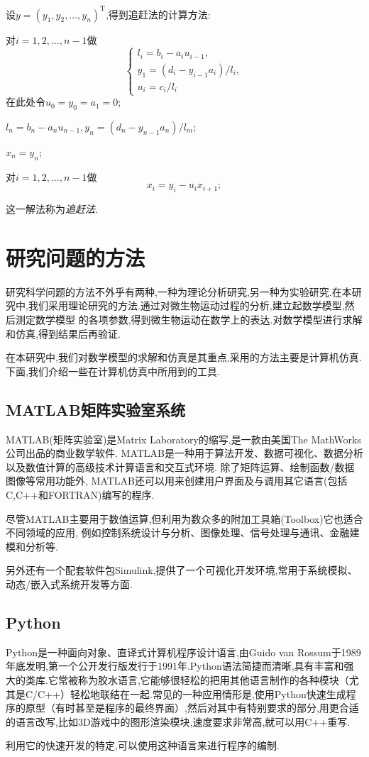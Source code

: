 设$y=(y_1,y_2,\ldots,y_n)^{\mathrm{T}}$,得到追赶法的计算方法:
\begin{asparaenum}
\item 对$i=1,2,\ldots,n-1$做
\begin{equation*}
 \begin{cases}
 l_i=b_i-a_iu_{i-1},\\
 y_1=(d_i-y_{i-1}a_i)/l_i,\\
 u_i=c_i/l_i
 \end{cases}
\end{equation*}
在此处令$u_0=y_0=a_1=0$;
\item $l_n=b_n-a_n u_{n-1},y_n=(d_n-y_{n-1}a_n)/l_m$;
\item $x_n=y_n$;
\item 对$i=1,2,\ldots,n-1$做
\begin{equation*}
 x_i=y_i-u_i x_{i+1};
\end{equation*}
\end{asparaenum}\par
这一解法称为\emph{追赶法}.
\section{研究问题的方法}
研究科学问题的方法不外乎有两种,一种为理论分析研究,另一种为实验研究.在本研究中,我们采用理论研究的方法.通过对微生物运动过程的分析,建立起数学模型,然后测定数学模型
的各项参数,得到微生物运动在数学上的表达.对数学模型进行求解和仿真,得到结果后再验证.\par
在本研究中,我们对数学模型的求解和仿真是其重点,采用的方法主要是计算机仿真.下面,我们介绍一些在计算机仿真中所用到的工具.
\subsection{MATLAB矩阵实验室系统}
MATLAB(矩阵实验室)是Matrix Laboratory的缩写,是一款由美国The MathWorks公司出品的商业数学软件.
MATLAB是一种用于算法开发、数据可视化、数据分析以及数值计算的高级技术计算语言和交互式环境.
除了矩阵运算、绘制函数/数据图像等常用功能外,
MATLAB还可以用来创建用户界面及与调用其它语言(包括C,C++和FORTRAN)编写的程序.\par
尽管MATLAB主要用于数值运算,但利用为数众多的附加工具箱(Toolbox)它也适合不同领域的应用,
例如控制系统设计与分析、图像处理、信号处理与通讯、金融建模和分析等.\par
另外还有一个配套软件包Simulink,提供了一个可视化开发环境,常用于系统模拟、动态/嵌入式系统开发等方面.
\subsection{Python}
Python是一种面向对象、直译式计算机程序设计语言,由Guido van Rossum于1989年底发明,第一个公开发行版发行于1991年.Python语法简捷而清晰,具有丰富和强大的类库.它常被称为胶水语言,它能够很轻松的把用其他语言制作的各种模块（尤其是C/C++）轻松地联结在一起.常见的一种应用情形是,使用Python快速生成程序的原型（有时甚至是程序的最终界面）,然后对其中有特别要求的部分,用更合适的语言改写,比如3D游戏中的图形渲染模块,速度要求非常高,就可以用C++重写.\par
利用它的快速开发的特定,可以使用这种语言来进行程序的编制.
